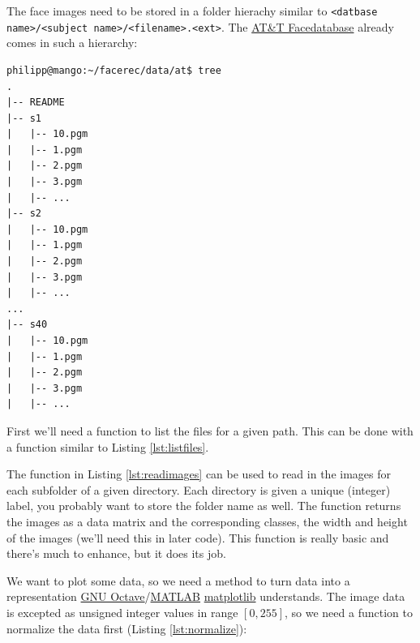 The face images need to be stored in a folder hierachy similar to \lstinline|<datbase name>/<subject name>/<filename>.<ext>|. The \href{http://www.cl.cam.ac.uk/research/dtg/attarchive/facedatabase.html}{AT\&T Facedatabase} already comes in such a hierarchy:

\begin{lstlisting}
philipp@mango:~/facerec/data/at$ tree
.
|-- README
|-- s1
|   |-- 10.pgm
|   |-- 1.pgm
|   |-- 2.pgm
|   |-- 3.pgm
|   |-- ...
|-- s2
|   |-- 10.pgm
|   |-- 1.pgm
|   |-- 2.pgm
|   |-- 3.pgm
|   |-- ...
...
|-- s40
|   |-- 10.pgm
|   |-- 1.pgm
|   |-- 2.pgm
|   |-- 3.pgm
|   |-- ...
\end{lstlisting}

\ifx\python\undefined
	First we'll need a function to list the files for a given path. This can be done with a function similar to Listing \ref{lst:listfiles}.
	
	
\fi

The function in Listing \ref{lst:readimages} can be used to read in the images for each subfolder of a given directory. Each directory is given a unique (integer) label, you probably want to store the folder name as well. The function returns the images\ifx\python\undefined{} as a data matrix\fi{} and the corresponding classes\ifx\python\undefined, the width and height of the images (we'll need this in later code)\fi{}. This function is really basic and there's much to enhance, but it does its job.

\ifx\python\undefined
	
\else
	
\fi

We want to plot some data, so we need a method to turn data into a representation \ifx\python\undefined \href{http://www.gnu.org/software/octave/}{GNU Octave}/\href{http://www.mathworks.com}{MATLAB} \else \href{http://matplotlib.sourceforge.net/}{matplotlib} \fi understands. The image data is excepted as unsigned integer values in range $[0,255]$, so we need a function to normalize the data first (Listing \ref{lst:normalize}):

\ifx\python\undefined
	
\else
	
\fi

